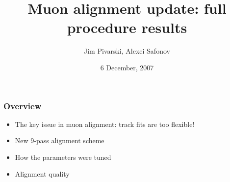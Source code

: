 \documentclass[compress]{beamer}
\title{Muon alignment update: full procedure results}
\author{Jim Pivarski, Alexei Safonov}
\institute{Texas A\&M University}
\date{ 6 December, 2007}
\begin{document}
\frame{\titlepage}


\begin{frame}
\frametitle{Overview}
\begin{itemize}\setlength{\itemsep}{0.5 cm}
\item The key issue in muon alignment: track fits are too flexible!
\item New 9-pass alignment scheme
\item How the parameters were tuned
\item Alignment quality
\end{itemize}
\vfill 
\mbox{ }
\end{frame}
\end{document}

